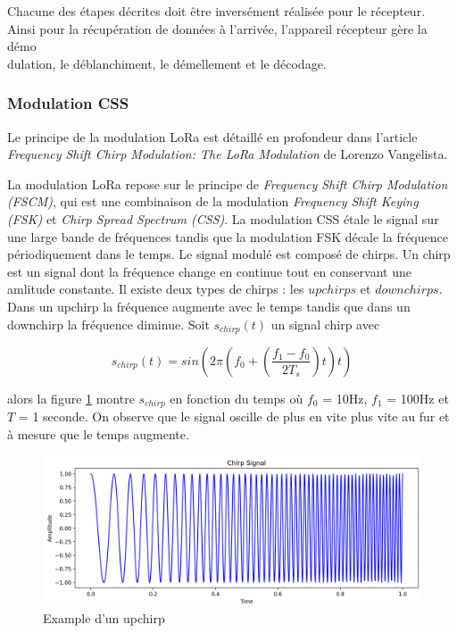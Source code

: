 \vspace{0.1cm}

Chacune des étapes décrites doit être inversément réalisée pour le récepteur. Ainsi pour la récupération de données à l'arrivée, l'appareil récepteur gère la démo \\ dulation, le déblanchiment, le démellement et le décodage.

\subsubsection{Modulation CSS}\label{css}

Le principe de la modulation LoRa est détaillé en profondeur dans l'article \textit{Frequency Shift Chirp Modulation: The LoRa Modulation}\cite{loraCSS} de Lorenzo Vangelista.

\vspace{0.1cm}

La modulation LoRa repose sur le principe de \textit{Frequency Shift Chirp Modulation (FSCM)}, qui est une combinaison de la modulation \textit{Frequency Shift Keying (FSK)} et \textit{Chirp Spread Spectrum (CSS)}.
La modulation CSS étale le signal sur une large bande de fréquences tandis que la modulation FSK décale la fréquence périodiquement dans le temps. Le signal modulé est composé de chirps. Un chirp est un signal dont la fréquence change en continue tout en conservant une amlitude constante. Il existe deux types de chirps : les $upchirps$ et $downchirps$.
Dans un upchirp la fréquence augmente avec le temps tandis que dans un downchirp la fréquence diminue. Soit $s_{chirp}(t)$ un signal chirp avec

\begin{equation}\label{eq3}
s_{chirp}(t) = sin(2\pi(f_0 + (\frac{f_1 - f_0}{2T_s})t)t)
\end{equation}

alors la figure \ref{term5} montre $s_{chirp}$ en fonction du temps où $f_0$ = 10Hz, $f_1$ = 100Hz et $T$ = 1 seconde. On observe que le signal oscille de plus en vite plus vite au fur et à mesure que le temps augmente.

\begin{figure}[h]
\centering

\includegraphics[scale=0.18]{images/CSSupchirp.png}
\caption{Example d'un upchirp}\label{term5}
\end{figure}

